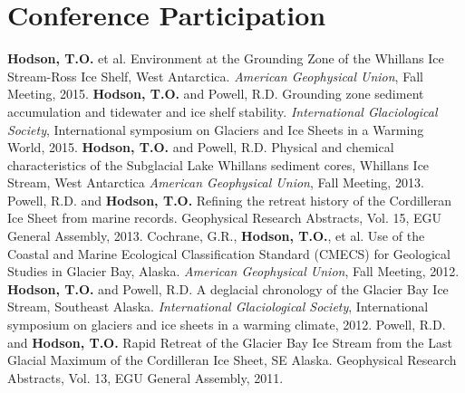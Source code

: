 \section{Conference Participation}
\begin{thebibliography}{3}
\bibitem{}\textbf{Hodson, T.O.} et al. Environment at the Grounding Zone of the Whillans Ice Stream-Ross Ice Shelf, West Antarctica.
\textsl{American Geophysical Union}, Fall Meeting, 2015.
\bibitem{}\textbf{Hodson, T.O.} and Powell, R.D. Grounding zone sediment accumulation and tidewater and ice shelf stability. 
\textsl{International Glaciological Society}, International symposium on Glaciers and Ice Sheets in a Warming World, 2015.
\bibitem{}\textbf{Hodson, T.O.} and Powell, R.D. Physical and chemical characteristics of the Subglacial Lake Whillans sediment cores, Whillans Ice Stream, West Antarctica
\textsl{American Geophysical Union}, Fall Meeting, 2013.
\bibitem{}Powell, R.D. and \textbf{Hodson, T.O.} Refining the retreat history of the Cordilleran Ice Sheet from marine records. Geophysical Research Abstracts, Vol. 15, EGU General Assembly, 2013.
\bibitem{}Cochrane, G.R., \textbf{Hodson, T.O.}, et al. Use of the Coastal and Marine Ecological Classification Standard (CMECS) for Geological Studies in Glacier Bay, Alaska.
\textsl{American Geophysical Union}, Fall Meeting, 2012.
\bibitem{}\textbf{Hodson, T.O.} and Powell, R.D. A deglacial chronology of the Glacier Bay Ice Stream, Southeast Alaska.
\textsl{International Glaciological Society}, International symposium on glaciers and ice sheets in a warming climate, 2012.
\bibitem{}Powell, R.D. and \textbf{Hodson, T.O.} Rapid Retreat of the Glacier Bay Ice Stream from the Last Glacial Maximum of the Cordilleran Ice Sheet, SE Alaska. Geophysical Research Abstracts, Vol. 13, EGU General Assembly, 2011.
\end{thebibliography}
